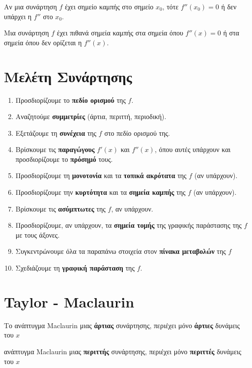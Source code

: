 \begin{prop}
  Αν μια συνάρτηση $f$ έχει σημείο καμπής στο σημείο $ x_{0} $, τότε $ f''(x_{0})=0 $ 
  ή δεν υπάρχει η $f''$ στο $ x_{0} $.
\end{prop}

\begin{rem}
  Μια συνάρτηση $f$ έχει πιθανά σημεία καμπής στα σημεία όπου $ f''(x)=0 $ ή στα 
  σημεία όπου δεν ορίζεται η $ f''(x) $.
\end{rem}

\section*{Μελέτη Συνάρτησης}

\begin{enumerate}
  \item Προσδιορίζουμε το \textbf{πεδίο ορισμού} της $f$.
  \item Αναζητούμε \textbf{συμμετρίες} (άρτια, περιττή, περιοδική).
  \item Εξετάζουμε τη \textbf{συνέχεια} της $f$ στο πεδίο ορισμού της.
  \item Βρίσκουμε τις \textbf{παραγώγους} $ f'(x) $ και $ f''(x) $, όπου αυτές υπάρχουν 
    και προσδιορίζουμε το \textbf{πρόσημό} τους.
  \item Προσδιορίζουμε τη \textbf{μονοτονία} και τα \textbf{τοπικά ακρότατα} της $f$ (αν 
    υπάρχουν).
  \item Προσδιορίζουμε την \textbf{κυρτότητα} και τα \textbf{σημεία καμπής} της $f$ (αν 
    υπάρχουν).
  \item Βρίσκουμε τις \textbf{ασύμπτωτες} της $f$, αν υπάρχουν.
  \item Προσδιορίζουμε, αν υπάρχουν, τα \textbf{σημεία τομής} της γραφικής παράστασης 
    της $f$ με τους άξονες.
  \item Συγκεντρώνουμε όλα τα παραπάνω στοιχεία στον \textbf{πίνακα μεταβολών} της $f$ 
  \item Σχεδιάζουμε τη \textbf{γραφική παράσταση} της $f$.
\end{enumerate}

\section*{Taylor - Maclaurin}

\begin{prop}
\item {}
  \begin{myitemize}
    \item Το ανάπτυγμα Maclaurin μιας \textbf{άρτιας} συνάρτησης, περιέχει μόνο
      \textbf{άρτιες} δυνάμεις του $x$ 
    \item ανάπτυγμα Maclaurin μιας \textbf{περιττής} συνάρτησης, περιέχει μόνο
      \textbf{περιττές} δυνάμεις του $x$ 
  \end{myitemize}
\end{prop}




